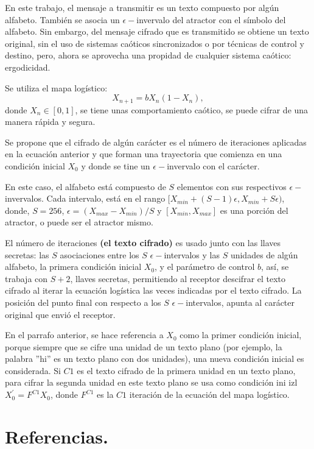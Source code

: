 \documentclass[10pt]{IEEEtran}
\begin{document}
En este trabajo, el mensaje a transmitir es un texto compuesto por algún alfabeto. También se asocia un $\epsilon-$invervalo del atractor con el símbolo del alfabeto. Sin embargo, del mensaje cifrado que es transmitido se obtiene un texto original,  sin el uso de sistemas caóticos sincronizados o por técnicas de control y destino, pero, ahora se aprovecha una propidad de cualquier sistema caótico: ergodicidad.

Se utiliza el mapa logístico:
\begin{equation}
X_{n+1}=bX_{n}(1- X_{n}),
\end{equation}
donde $X_{n} \in [0,1]$, se tiene unas comportamiento caótico, se puede cifrar de una manera rápida y segura.

Se propone que el cifrado de algún carácter es el número de iteraciones aplicadas en la ecuación anterior y que forman una trayectoria que comienza en una condición inicial $X_{0}$ y donde se tine un $\epsilon-$invervalo con el carácter.

En este caso, el alfabeto está compuesto de $S$ elementos con sus respectivos $\epsilon-$invervalos. Cada intervalo, está en el rango $[X_{min} + (S-1)\epsilon, X_{min}+ S \epsilon )$, donde, $S=256$, $\epsilon = (X_{max}- X_{min})/S$ y $[X_{min}, X_{max}]$ es una porción del atractor, o puede ser el atractor mismo.

El número de iteraciones \textbf{(el texto cifrado)} es usado junto con las llaves secretas: las $S$ asociaciones entre los $S$ $\epsilon-$intervalos y las $S$ unidades de algún alfabeto, la primera condición inicial $X_{0}$, y el parámetro de control $b$, así, se trabaja con $S+2$, llaves secretas, permitiendo al receptor descifrar el texto cifrado al iterar la ecuación logística las veces indicadas por el texto cifrado. La posición del punto final con respecto a los $S$ $\epsilon-$intervalos, apunta al carácter original que envió el receptor. 


En el parrafo anterior, se hace referencia a $X_{0}$ como la primer condición inicial, porque siempre que se cifre una unidad de un texto plano (por ejemplo, la palabra ''hi'' es un texto plano con dos unidades), una nueva condición inicial es considerada. Si $C1$ es el texto cifrado de la primera unidad en un texto plano, para cifrar la segunda unidad en este texto plano se usa como condición ini izl $X^{'}_{0}= F^{C1}X_{0}$, donde $F^{C1}$ es la $C1$ iteración de la ecuación del mapa logístico. 

\section{Referencias.}


%

%
\end{document}
